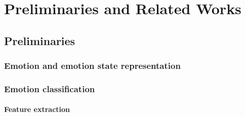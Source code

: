 \graphicspath{{Figures/}}

\part{Preliminaries and Related Works}  %


\chapter{Preliminaries}\label{ch:preli}

\section{Emotion and emotion state representation} \label{sec:emotion-representation}


\section{Emotion classification}\label{sec:emotion-recognition-methods}



\subsection{Feature extraction}\label{sec:feature-extraction}


    



